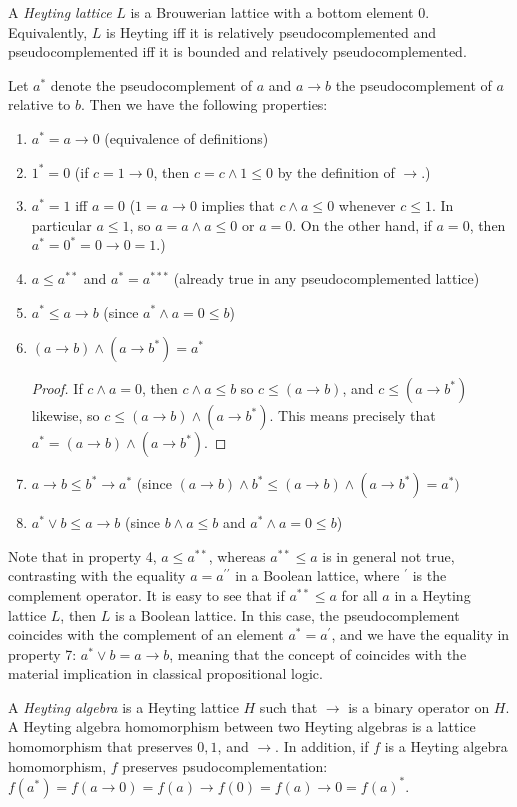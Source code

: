 \documentclass[12pt]{article}
\begin{document}
A \emph{Heyting lattice} $L$ is a Brouwerian lattice with a bottom element $0$.  Equivalently, $L$ is Heyting iff it is relatively pseudocomplemented and pseudocomplemented iff it is bounded and relatively pseudocomplemented.

Let $a^*$ denote the pseudocomplement of $a$ and $a\to b$ the pseudocomplement of $a$ relative to $b$. Then we have the following properties:

\begin{enumerate}
\item $a^*=a\to 0$ (equivalence of definitions)
\item $1^*=0$ (if $c=1\to 0$, then $c=c\wedge 1\le 0$ by the definition of $\to$.)
\item $a^*=1$ iff $a=0$ ($1=a\to 0$ implies that $c\wedge a\le 0$ whenever $c\le 1$.  In particular $a\le 1$, so $a=a\wedge a\le 0$ or $a=0$.  On the other hand, if $a=0$, then $a^*=0^*=0\to 0=1$.)
\item $a\le a^{**}$ and $a^*=a^{***}$ (already true in any pseudocomplemented lattice)
\item $a^*\le a\to b$ (since $a^*\wedge a=0\le b$)
\item $(a\to b)\wedge (a\to b^*)=a^*$ 
\begin{proof}
If $c\wedge a=0$, then $c\wedge a\le b$ so $c\le (a\to b)$, and $c\le (a\to b^*)$ likewise, so $c\le (a\to b)\wedge (a\to b^*)$.  This means precisely that $a^*=(a\to b)\wedge (a\to b^*)$.
\end{proof}
\item $a\to b\le b^*\to a^*$ (since $(a\to b)\wedge b^*\le (a\to b)\wedge (a\to b^*)=a^*)$
\item $a^*\vee b\le a\to b$ (since $b\wedge a\le b$ and $a^* \wedge a=0\le b$)
\end{enumerate}

Note that in property 4, $a\le a^{**}$, whereas $a^{**}\le a$ is in general not true, contrasting with the equality $a=a^{\prime\prime}$ in a Boolean lattice, where $^{\prime}$ is the complement operator.  It is easy to see that if $a^{**}\le a$ for all $a$ in a Heyting lattice $L$, then $L$ is a Boolean lattice.  In this case, the pseudocomplement coincides with the complement of an element $a^*=a^{\prime}$, and we have the equality in property 7: $a^*\vee b=a\to b$, meaning that the concept of  coincides with the material implication in classical propositional logic.

A \emph{Heyting algebra} is a Heyting lattice $H$ such that $\to$ is a binary operator on $H$.  A Heyting algebra homomorphism between two Heyting algebras is a lattice homomorphism that preserves $0,1$, and $\to$.  In addition, if $f$ is a Heyting algebra homomorphism, $f$ preserves psudocomplementation: $f(a^*)=f(a\to 0)=f(a)\to f(0)=f(a)\to 0=f(a)^*$.
\end{document}
